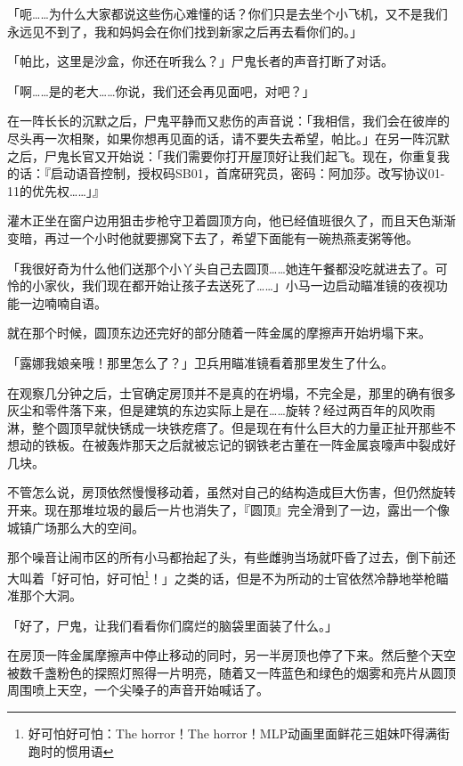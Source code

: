 「呃……为什么大家都说这些伤心难懂的话？你们只是去坐个小飞机，又不是我们永远见不到了，我和妈妈会在你们找到新家之后再去看你们的。」

「帕比，这里是沙盒，你还在听我么？」尸鬼长者的声音打断了对话。

「啊……是的老大……你说，我们还会再见面吧，对吧？」

在一阵长长的沉默之后，尸鬼平静而又悲伤的声音说：「我相信，我们会在彼岸的尽头再一次相聚，如果你想再见面的话，请不要失去希望，帕比。」在另一阵沉默之后，尸鬼长官又开始说：「我们需要你打开屋顶好让我们起飞。现在，你重复我的话：『启动语音控制，授权码SB01，首席研究员，密码：阿加莎。改写协议01-11的优先权……」』

\horizonline


灌木正坐在窗户边用狙击步枪守卫着圆顶方向，他已经值班很久了，而且天色渐渐变暗，再过一个小时他就要挪窝下去了，希望下面能有一碗热燕麦粥等他。

「我很好奇为什么他们送那个小丫头自己去圆顶……她连午餐都没吃就进去了。可怜的小家伙，我们现在都开始让孩子去送死了……」小马一边启动瞄准镜的夜视功能一边喃喃自语。

就在那个时候，圆顶东边还完好的部分随着一阵金属的摩擦声开始坍塌下来。

「露娜我娘亲哦！那里怎么了？」卫兵用瞄准镜看着那里发生了什么。

在观察几分钟之后，士官确定房顶并不是真的在坍塌，不完全是，那里的确有很多灰尘和零件落下来，但是建筑的东边实际上是在……旋转？经过两百年的风吹雨淋，整个圆顶早就快锈成一块铁疙瘩了。但是现在有什么巨大的力量正扯开那些不想动的铁板。在被轰炸那天之后就被忘记的钢铁老古董在一阵金属哀嚎声中裂成好几块。

不管怎么说，房顶依然慢慢移动着，虽然对自己的结构造成巨大伤害，但仍然旋转开来。现在那堆垃圾的最后一片也消失了，『圆顶』完全滑到了一边，露出一个像城镇广场那么大的空间。

那个噪音让闹市区的所有小马都抬起了头，有些雌驹当场就吓昏了过去，倒下前还大叫着「好可怕，好可怕\footnote{好可怕好可怕：The horror！The horror！MLP动画里面鲜花三姐妹吓得满街跑时的惯用语}！」之类的话，但是不为所动的士官依然冷静地举枪瞄准那个大洞。

「好了，尸鬼，让我们看看你们腐烂的脑袋里面装了什么。」

在房顶一阵金属摩擦声中停止移动的同时，另一半房顶也停了下来。然后整个天空被数千盏粉色的探照灯照得一片明亮，随着又一阵蓝色和绿色的烟雾和亮片从圆顶周围喷上天空，一个尖嗓子的声音开始喊话了。

